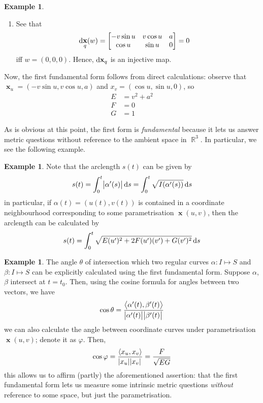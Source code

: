 \documentclass{amsart} %
\theoremstyle{mytheoremstyle}
\theoremstyle{definition}
\newtheorem{example}[definition]{Example}
\numberwithin{equation}{section}
\DeclareMathOperator{\R}{\mathbb{R}}
\DeclareMathOperator{\1}{\mathbbm{1}}
\DeclareMathOperator{\D}{\dif}
\DeclareMathOperator{\x}{\mathbf{x}}
\renewcommand{\phi}{\varphi}
\newcommand{\innerproduct}[2]{\left\langle #1,#2 \right\rangle}
\renewcommand{\phi}{\varphi}
\begin{document}
\begin{example}
\begin{enumerate}
		\item See that
		\begin{align*}
		\D \x_q (w) &= \begin{bmatrix*}[c]
			- v \sin u & v \cos u & a \\
			\cos u & \sin u & 0
		\end{bmatrix*} = 0
		\end{align*}
		iff $w = (0,0,0)$. Hence, $\D \x_q$ is an injective map.
	\end{enumerate}
	Now, the first fundamental form follows from direct calculations: observe that $\x_u = (-v\sin u, v \cos u, a)$ and $x_v = (\cos u, \sin u, 0)$, so 
	\begin{align*}
		E &= v^2 + a^2 \\
		F &= 0 \\
		G &= 1 
	\end{align*}
\end{example}

As is obvious at this point, the first form is \textit{fundamental} because it lets us answer metric questions without reference to the ambient space in $\R^3$. In particular, we see the following example.

\begin{example}
	\label{examplearclengthfirstfundamentalform}
	Note that the arclength $s(t)$ can be given by
	\begin{align*}
		s(t) = \int_{0}^{t} \abs{\alpha'(s)} \D s = \int_{0}^{t} \sqrt{I(\alpha'(s))} \D s
	\end{align*}
	in particular, if $\alpha(t) = (u(t),v(t))$ is contained in a coordinate neighbourhood corresponding to some parametrisation $\x(u,v)$, then the arclength can be calculated by
	\begin{align*}
		s(t) = \int_{0}^{t} \sqrt{E (u')^2 + 2 F (u')(v') + G (v')^2} \D s
	\end{align*}
\end{example}


\begin{example}
	\label{exampleanglebetweencurvesatintersection}
	The angle $\theta$ of intersection which two regular curves $\alpha: I \mapsto S$ and $\beta: I \mapsto S$ can be explicitly calculated using the first fundamental form. Suppose $\alpha$, $\beta$ intersect at $t=t_0$. Then, using the cosine formula for angles between two vectors, we have
	\begin{align}
		\cos \theta = \frac{\innerproduct{\alpha'(t)}{\beta'(t)}}{\abs{\alpha'(t)} \abs{\beta'(t)}}
	\end{align}
	we can also calculate the angle between coordinate curves under parametrisation $\x(u,v)$; denote it as $\phi$. Then,
	\begin{align}
		\label{eqanglebetweencoordinatecurves}
		\cos \phi = \frac{\innerproduct{x_u}{x_v}}{\abs{x_u} \abs{x_v}} = \frac{F}{\sqrt{EG}}
	\end{align}
	this allows us to affirm (partly) the aforementioned assertion: that the first fundamental form lets us measure some intrinsic metric questions \textit{without} reference to some space, but just the parametrisation.
\end{example}
\end{document}
